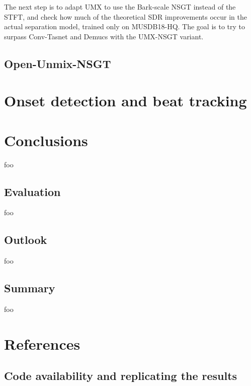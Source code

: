 \documentclass[letter,12pt,notitlepage]{article}
\begin{document}
The next step is to adapt UMX to use the Bark-scale NSGT instead of the STFT, and check how much of the theoretical SDR improvements occur in the actual separation model, trained only on MUSDB18-HQ. The goal is to try to surpass Conv-Tasnet and Demucs with the UMX-NSGT variant.

\subsection{Open-Unmix-NSGT}


\vfill
\clearpage

\section{Onset detection and beat tracking}
\label{sec:beattrack}

\vfill
\clearpage

\section{Conclusions}
\label{sec:conclusion}

foo

\subsection{Evaluation}

foo

\subsection{Outlook}

foo

\subsection{Summary}

foo

\vfill
\clearpage %

\section{References}
\printbibliography[heading=none]

\vfill
\clearpage %

\begin{appendices}

\section{Code availability and replicating the results}
\label{appendix:coderesultsrepro}

\end{appendices}
\end{document}
